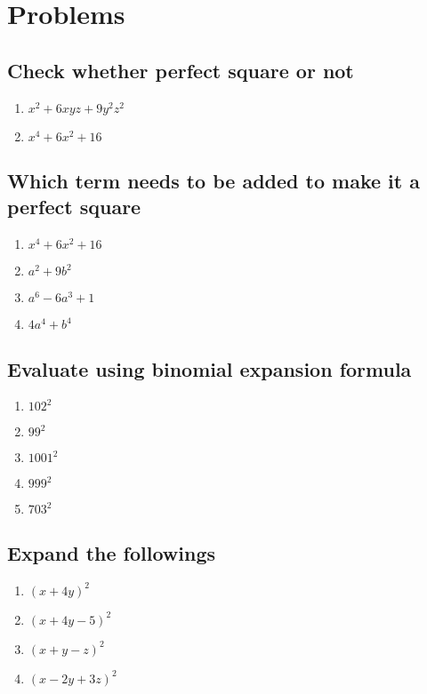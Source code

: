 \documentclass[12pt,a4paper,twoside]{book}
\begin{document}
	\section{Problems}
	\subsection{Check whether perfect square or not}
	\begin{multicols}{2}
		\begin{enumerate}
			\item $x^2+6xyz+9y^2z^2$
			\item $x^4+6x^2+16$
		\end{enumerate}
	\end{multicols}
	\subsection{Which term needs to be added to make it a perfect square}
	\begin{multicols}{2}
		\begin{enumerate}
			\item $x^4+6x^2+16$
			\item $a^2+9b^2$
			\item $a^6-6a^3+1$
			\item $4a^4+b^4$
		\end{enumerate}
	\end{multicols}
	\subsection{Evaluate using binomial expansion formula}
	\begin{multicols}{5}
		\begin{enumerate}
			\item $102^{2} $
			\item $99^{2} $
			\item $1001^2 $
			\item $999^{2} $
			\item $703^{2 }$
		\end{enumerate}
	\end{multicols}
	\subsection{Expand the followings}
	\begin{multicols}{2}
		\begin{enumerate}
			\item $(x+4y)^2$
			\item  $(x+4y-5)^2$
			\item $(x+y-z)^2$
			\item $(x-2y+3z)^2$
		\end{enumerate}
	\end{multicols}
\end{document}
